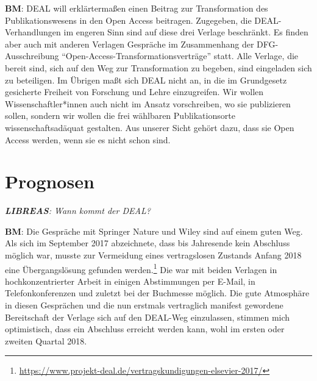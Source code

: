 \documentclass[a4paper,
fontsize=11pt,
oneside,
numbers=noperiodatend,
parskip=half-,
bibliography=totoc,
final
]{scrartcl}
\begin{document}
\textbf{BM}: DEAL will erklärtermaßen einen Beitrag zur Transformation
des Publikationswesens in den Open Access beitragen. Zugegeben, die
DEAL-Verhandlungen im engeren Sinn sind auf diese drei Verlage
beschränkt. Es finden aber auch mit anderen Verlagen Gespräche im
Zusammenhang der DFG-Ausschreibung
\enquote{Open-Access-Transformationsverträge} statt. Alle Verlage, die
bereit sind, sich auf den Weg zur Transformation zu begeben, sind
eingeladen sich zu beteiligen. Im Übrigen maßt sich DEAL nicht an, in
die im Grundgesetz gesicherte Freiheit von Forschung und Lehre
einzugreifen. Wir wollen Wissenschaftler*innen auch nicht im Ansatz
vorschreiben, wo sie publizieren sollen, sondern wir wollen die frei
wählbaren Publikationsorte wissenschaftsadäquat gestalten. Aus unserer
Sicht gehört dazu, dass sie Open Access werden, wenn sie es nicht schon
sind.

\hypertarget{prognosen}{%
\section*{Prognosen}\label{prognosen}}

\emph{\textbf{LIBREAS}: Wann kommt der DEAL?}

\textbf{BM}: Die Gespräche mit Springer Nature und Wiley sind auf einem
guten Weg. Als sich im September 2017 abzeichnete, dass bis Jahresende
kein Abschluss möglich war, musste zur Vermeidung eines vertragslosen
Zustands Anfang 2018 eine Übergangslösung gefunden werden.\footnote{\url{https://www.projekt-deal.de/vertragskundigungen-elsevier-2017/}}
Die war mit beiden Verlagen in hochkonzentrierter Arbeit in einigen
Abstimmungen per E-Mail, in Telefonkonferenzen und zuletzt bei der
Buchmesse möglich. Die gute Atmosphäre in diesen Gesprächen und die nun
erstmals vertraglich manifest gewordene Bereitschaft der Verlage sich
auf den DEAL-Weg einzulassen, stimmen mich optimistisch, dass ein
Abschluss erreicht werden kann, wohl im ersten oder zweiten Quartal
2018.
\end{document}
